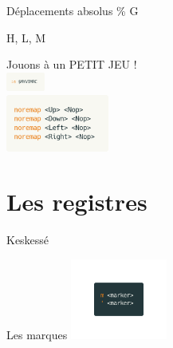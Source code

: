 \documentclass[10pt]{beamer}
\begin{document}
			\begin{frame}{Déplacements absolus}
				\%
				G

				H, L, M
			\end{frame}

		\begin{frame}[standout]
			Jouons à un PETIT JEU !\\
			\vspace{10pt}
			\includegraphics[width=48]{img/edit-vimrc.png}\\
			\vspace{10pt}
			\includegraphics[width=128]{img/harder.png}
		\end{frame}

		\section{Les registres}
			\begin{frame}{Keskessé}
			\end{frame}

			\begin{frame}{Les marques}
				\center
				\includegraphics[height=100]{img/markers.png}
			\end{frame}
\end{document}
